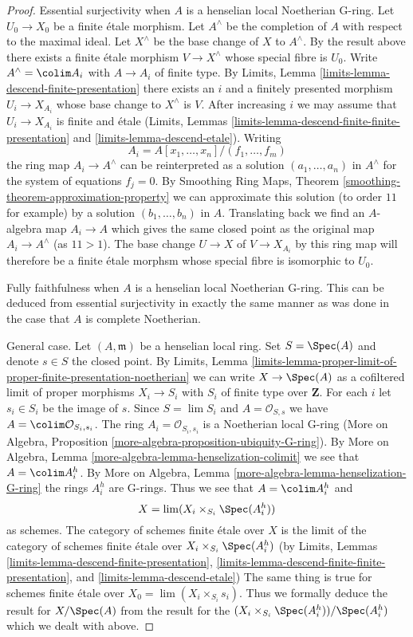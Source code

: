 \begin{proof}
\medskip\noindent
Essential surjectivity when $A$ is a henselian local Noetherian G-ring.
Let $U_0 \to X_0$ be a finite \'etale morphism.
Let $A^\wedge$ be the completion of $A$ with respect to the maximal ideal.
Let $X^\wedge$ be the base change of $X$ to $A^\wedge$.
By the result above there exists a finite \'etale morphism
$V \to X^\wedge$ whose special fibre is $U_0$.
Write $A^\wedge = \colim A_i$ with $A \to A_i$ of finite type.
By Limits, Lemma \ref{limits-lemma-descend-finite-presentation}
there exists an $i$ and a finitely presented morphism $U_i \to X_{A_i}$
whose base change to $X^\wedge$ is $V$. After increasing $i$
we may assume that $U_i \to X_{A_i}$ is finite and \'etale
(Limits, Lemmas \ref{limits-lemma-descend-finite-finite-presentation} and
\ref{limits-lemma-descend-etale}). Writing
$$
A_i = A[x_1, \ldots, x_n]/(f_1, \ldots, f_m)
$$
the ring map $A_i \to A^\wedge$ can be reinterpreted as a solution
$(a_1, \ldots, a_n)$ in $A^\wedge$ for the system of equations $f_j = 0$.
By Smoothing Ring Maps, Theorem \ref{smoothing-theorem-approximation-property}
we can approximate this solution (to order $11$ for example) by a solution
$(b_1, \ldots, b_n)$ in $A$. Translating back we find an $A$-algebra map
$A_i \to A$ which gives the same closed point as the original map
$A_i \to A^\wedge$ (as $11 > 1$). The base change $U \to X$ of $V \to X_{A_i}$
by this ring map will therefore be a finite \'etale morphsm whose
special fibre is isomorphic to $U_0$.

\medskip\noindent
Fully faithfulness when $A$ is a henselian local Noetherian G-ring.
This can be deduced from essential surjectivity in exactly the same
manner as was done in the case that $A$ is complete Noetherian.

\medskip\noindent
General case. Let $(A, \mathfrak m)$ be a henselian local ring.
Set $S = \Spec(A)$ and denote $s \in S$ the closed point. By Limits, Lemma
\ref{limits-lemma-proper-limit-of-proper-finite-presentation-noetherian}
we can write $X \to \Spec(A)$ as a cofiltered limit of
proper morphisms $X_i \to S_i$ with $S_i$ of finite type over $\mathbf{Z}$.
For each $i$ let $s_i \in S_i$ be the image of $s$.
Since $S = \lim S_i$ and $A = \mathcal{O}_{S, s}$ we have
$A = \colim \mathcal{O}_{S_i, s_i}$. The ring $A_i = \mathcal{O}_{S_i, s_i}$
is a Noetherian local G-ring (More on Algebra, Proposition
\ref{more-algebra-proposition-ubiquity-G-ring}).
By More on Algebra, Lemma \ref{more-algebra-lemma-henselization-colimit}
we see that $A = \colim A_i^h$. By
More on Algebra, Lemma \ref{more-algebra-lemma-henselization-G-ring}
the rings $A_i^h$ are G-rings. Thus we see that $A = \colim A_i^h$ and
$$
X = \lim (X_i \times_{S_i} \Spec(A_i^h))
$$
as schemes. The category of schemes finite \'etale over $X$ is the limit
of the category of schemes finite \'etale over
$X_i \times_{S_i} \Spec(A_i^h)$ (by
Limits, Lemmas
\ref{limits-lemma-descend-finite-presentation},
\ref{limits-lemma-descend-finite-finite-presentation}, and
\ref{limits-lemma-descend-etale})
The same thing is true for schemes finite \'etale over
$X_0 = \lim (X_i \times_{S_i} s_i)$.
Thus we formally deduce the result for $X / \Spec(A)$
from the result for the $(X_i \times_{S_i} \Spec(A_i^h)) / \Spec(A_i^h)$
which we dealt with above.
\end{proof}

